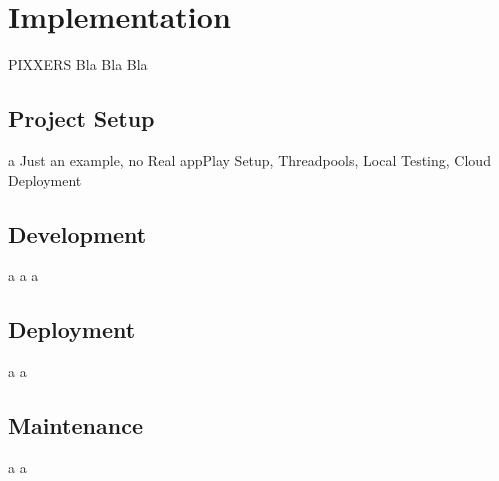 \chapter{Implementation}

PIXXERS Bla Bla Bla

\section{Project Setup} \newpage a 
Just an example, no Real appPlay Setup, Threadpools, Local Testing, Cloud Deployment

\section{Development} \newpage a \newpage a \newpage a 

\section{Deployment} \newpage a \newpage a

\section{Maintenance} \newpage a \newpage a